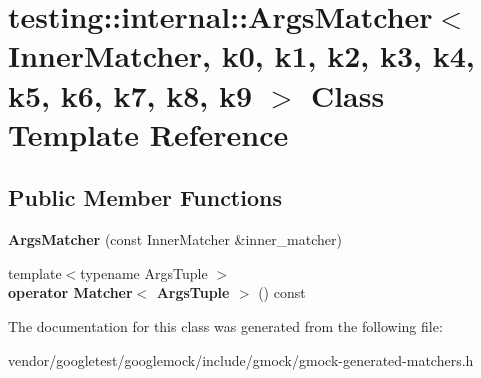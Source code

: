 \hypertarget{classtesting_1_1internal_1_1ArgsMatcher}{}\section{testing\+:\+:internal\+:\+:Args\+Matcher$<$ Inner\+Matcher, k0, k1, k2, k3, k4, k5, k6, k7, k8, k9 $>$ Class Template Reference}
\label{classtesting_1_1internal_1_1ArgsMatcher}
\subsection*{Public Member Functions}
\begin{DoxyCompactItemize}
\item 
{\bfseries Args\+Matcher} (const Inner\+Matcher \&inner\+\_\+matcher)\hypertarget{classtesting_1_1internal_1_1ArgsMatcher_a2879d7455f2da2a5a2f2b6759dbc0561}{}\label{classtesting_1_1internal_1_1ArgsMatcher_a2879d7455f2da2a5a2f2b6759dbc0561}

\item 
{\footnotesize template$<$typename Args\+Tuple $>$ }\\{\bfseries operator Matcher$<$ Args\+Tuple $>$} () const \hypertarget{classtesting_1_1internal_1_1ArgsMatcher_ae94d3e9b43d0102875a1494ca56e6d26}{}\label{classtesting_1_1internal_1_1ArgsMatcher_ae94d3e9b43d0102875a1494ca56e6d26}

\end{DoxyCompactItemize}


The documentation for this class was generated from the following file\+:\begin{DoxyCompactItemize}
\item 
vendor/googletest/googlemock/include/gmock/gmock-\/generated-\/matchers.\+h\end{DoxyCompactItemize}
